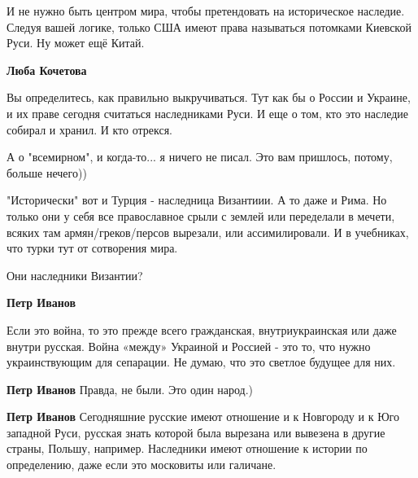 \begin{itemize}
\begin{itemize}
И не нужно быть центром мира, чтобы претендовать на историческое наследие.
Следуя вашей логике, только США имеют права называться потомками Киевской Руси.
Ну может ещё Китай.

 
\textbf{Люба Кочетова} 

Вы определитесь, как правильно выкручиваться. Тут как бы о России и Украине, и
их праве сегодня считаться наследниками Руси. И еще о том, кто это наследие
собирал и хранил. И кто отрекся.

А о "всемирном", и когда-то... я ничего не писал. Это вам пришлось, потому,
больше нечего))

"Исторически" вот и Турция - наследница Византиии. А то даже и Рима. Но только
они у себя все православное срыли с землей или переделали в мечети, всяких там
армян/греков/персов вырезали, или ассимилировали. И в учебниках, что турки тут
от сотворения мира.

Они наследники Византии?


 
\textbf{Петр Иванов} 

Если это война, то это прежде всего гражданская, внутриукраинская или даже
внутри русская. Война «между» Украиной и Россией - это то, что нужно
украинствующим для сепарации. Не думаю, что это светлое будущее для них.

 
\textbf{Петр Иванов} Правда, не были. Это один народ.)

 
\textbf{Петр Иванов} Сегодняшние русские имеют отношение и к Новгороду и к Юго западной Руси, русская знать которой была вырезана или вывезена в другие страны, Польшу, например. Наследники имеют отношение к истории по определению, даже если это московиты или галичане.


\end{itemize}
\end{itemize}
